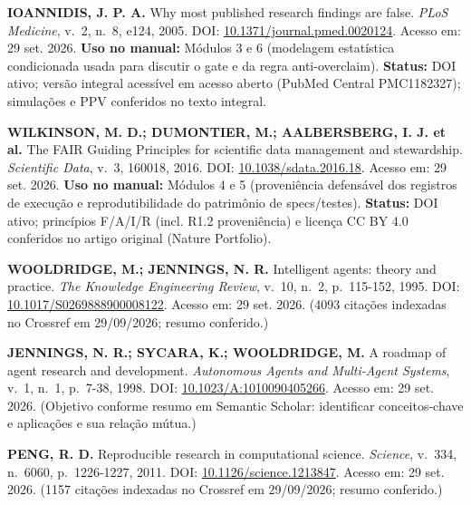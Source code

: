 \begin{referencia}
\textbf{IOANNIDIS, J. P. A.} Why most published research findings are false.
\emph{PLoS Medicine}, v.~2, n.~8, e124, 2005. DOI:
\href{https://doi.org/10.1371/journal.pmed.0020124}{10.1371/journal.pmed.0020124}. Acesso em: 29 set. 2026.
\textbf{Uso no manual:} Módulos 3 e 6 (modelagem estatística condicionada usada para discutir o gate
 e da regra anti-overclaim).
\textbf{Status:} DOI ativo; versão integral acessível em acesso aberto
(PubMed Central PMC1182327); simulações e PPV conferidos no texto integral.
\end{referencia}

\begin{referencia}
\textbf{WILKINSON, M. D.; DUMONTIER, M.; AALBERSBERG, I. J. et al.} The FAIR
Guiding Principles for scientific data management and stewardship.
\emph{Scientific Data}, v.~3, 160018, 2016. DOI:
\href{https://doi.org/10.1038/sdata.2016.18}{10.1038/sdata.2016.18}. Acesso em: 29 set. 2026.
\textbf{Uso no manual:} Módulos 4 e 5 (proveniência defensável dos registros de
execução e reprodutibilidade do patrimônio de specs/testes).
\textbf{Status:} DOI ativo; princípios F/A/I/R (incl. R1.2 proveniência) e
licença CC BY 4.0 conferidos no artigo original (Nature Portfolio).
\end{referencia}

\begin{referencia}
\textbf{WOOLDRIDGE, M.; JENNINGS, N. R.} Intelligent agents: theory and
practice. \emph{The Knowledge Engineering Review}, v.~10, n.~2, p.~115-152,
1995. DOI:
\href{https://doi.org/10.1017/S0269888900008122}{10.1017/S0269888900008122}. Acesso em: 29 set. 2026.
(4093 citações indexadas no Crossref em 29/09/2026; resumo conferido.)
\end{referencia}

\begin{referencia}
\textbf{JENNINGS, N. R.; SYCARA, K.; WOOLDRIDGE, M.} A roadmap of agent
research and development. \emph{Autonomous Agents and Multi-Agent Systems},
v.~1, n.~1, p.~7-38, 1998. DOI:
\href{https://doi.org/10.1023/A:1010090405266}{10.1023/A:1010090405266}. Acesso em: 29 set. 2026.
(Objetivo conforme resumo em Semantic Scholar: identificar conceitos-chave e
aplicações e sua relação mútua.)
\end{referencia}

\begin{referencia}
\textbf{PENG, R. D.} Reproducible research in computational science.
\emph{Science}, v.~334, n.~6060, p.~1226-1227, 2011. DOI:
\href{https://doi.org/10.1126/science.1213847}{10.1126/science.1213847}. Acesso em: 29 set. 2026.
(1157 citações indexadas no Crossref em 29/09/2026; resumo conferido.)
\end{referencia}


